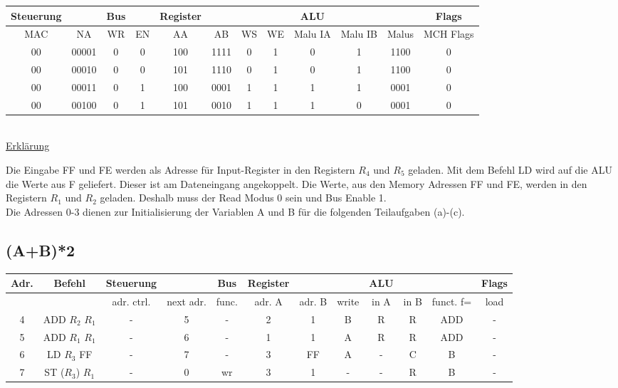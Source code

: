 \documentclass[paper=a4, fontsize=11pt]{scrartcl}
\numberwithin{equation}{section}
\numberwithin{figure}{section}
\numberwithin{table}{section}
\begin{document}
\begin{tabular}{|cc|cc|cccc|ccc|c|}
\hline
Steuerung & & Bus & & Register & & & & ALU & & & Flags \\
\hline
MAC & NA & WR & EN & AA & AB & WS & WE & Malu IA & Malu IB & Malus & MCH Flags \\
\hline
00 & 00001 & 0 & 0 & 100 & 1111 & 0 & 1 & 0 & 1 & 1100 & 0  \\
\hline
00 & 00010 & 0 & 0 & 101 & 1110 & 0 & 1 & 0 & 1 & 1100 & 0 \\
\hline
00 & 00011 & 0 & 1 & 100 & 0001 & 1 & 1 & 1 & 1 & 0001 & 0 \\
\hline
00 & 00100 & 0 & 1 & 101 & 0010 & 1 & 1 & 1 & 0 & 0001 & 0 \\
\hline
\end{tabular} \\

\underline{Erklärung}

Die Eingabe FF und FE werden als Adresse für Input-Register in den Registern $R_{4}$ und $R_{5}$ geladen. Mit dem Befehl LD wird auf die ALU die Werte aus F geliefert. Dieser ist am Dateneingang angekoppelt. Die Werte, aus den Memory Adressen FF und FE, werden in den Registern $R_{1}$ und $R_{2}$ geladen. Deshalb muss der Read Modus 0 sein und Bus Enable 1. \\

Die Adressen 0-3 dienen zur Initialisierung der Variablen A und B für die folgenden Teilaufgaben (a)-(c).


\subsection{(A+B)*2}

\begin{tabular}{|c|c|cc|c|ccc|ccc|c|}
\hline
Adr. & Befehl &Steuerung & & Bus & Register & & & ALU & & & Flags \\
\hline
& & adr. ctrl. & next adr. & func. & adr. A & adr. B & write & in A & in B & funct. f= & load \\
\hline
4 & ADD $R_{2}$ $R_{1}$ & - & 5 & - & 2 & 1 & B & R & R & ADD & - \\
\hline
5 & ADD $R_{1}$ $R_{1}$ & - & 6 & - & 1 & 1 & A & R & R & ADD & - \\
\hline
6 & LD $R_{3}$ FF & - & 7 & - & 3 & FF & A & - & C & B & - \\
\hline
7 & ST ($R_{3}$) $R_{1}$ & - & 0 & wr & 3 & 1 & - & - & R & B  & - \\
\hline
\end{tabular} \\
\end{document}
